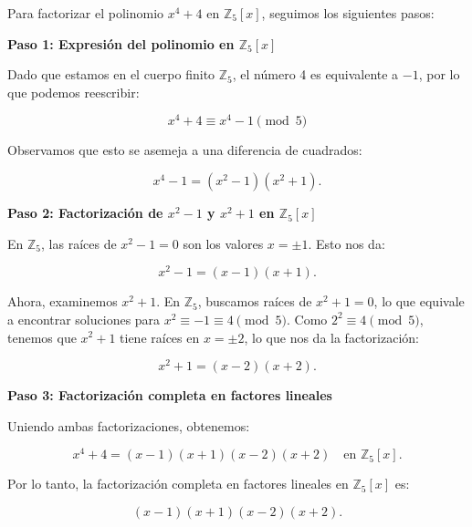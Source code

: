 Para factorizar el polinomio \( x^4 + 4 \) en \( \mathbb{Z}_5[x] \), seguimos los siguientes pasos:

\smallskip

\textbf{Paso 1: Expresión del polinomio en \( \mathbb{Z}_5[x] \)}

Dado que estamos en el cuerpo finito \( \mathbb{Z}_5 \), el número 4 es equivalente a \(-1\), por lo que podemos reescribir:

\[
x^4 + 4 \equiv x^4 - 1 \pmod{5}
\]

Observamos que esto se asemeja a una diferencia de cuadrados:

\[
x^4 - 1 = (x^2 - 1)(x^2 + 1).
\]

\smallskip

\textbf{Paso 2: Factorización de \( x^2 - 1 \) y \( x^2 + 1 \) en \( \mathbb{Z}_5[x] \)}

En \( \mathbb{Z}_5 \), las raíces de \( x^2 - 1 = 0 \) son los valores \( x = \pm 1 \). Esto nos da:

\[
x^2 - 1 = (x - 1)(x + 1).
\]

Ahora, examinemos \( x^2 + 1 \). En \( \mathbb{Z}_5 \), buscamos raíces de \( x^2 + 1 = 0 \), lo que equivale a encontrar soluciones para \( x^2 \equiv -1 \equiv 4 \pmod{5} \). Como \( 2^2 \equiv 4 \pmod{5} \), tenemos que \( x^2 + 1 \) tiene raíces en \( x = \pm 2 \), lo que nos da la factorización:

\[
x^2 + 1 = (x - 2)(x + 2).
\]

\smallskip

\textbf{Paso 3: Factorización completa en factores lineales}

Uniendo ambas factorizaciones, obtenemos:

\[
x^4 + 4 = (x - 1)(x + 1)(x - 2)(x + 2) \quad \text{en } \mathbb{Z}_5[x].
\]

Por lo tanto, la factorización completa en factores lineales en \( \mathbb{Z}_5[x] \) es:

\[
(x - 1)(x + 1)(x - 2)(x + 2).
\]
